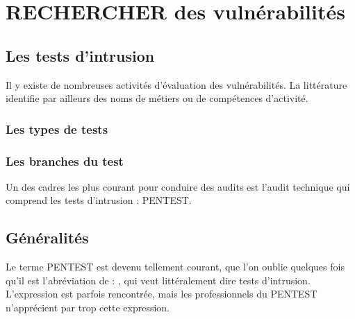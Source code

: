 \uchap{\jobname}


\section{RECHERCHER des vulnérabilités}

\subsection{Les tests d'intrusion}

Il y existe de nombreuses activités d'évaluation des vulnérabilités. La littérature identifie par ailleurs des noms de métiers ou de compétences d'activité.

\begin{frame}
\frametitle<presentation>{Les types de tests}
\end{frame}


\begin{frame}
\frametitle<presentation>{Les branches du test}
\end{frame}



Un des cadres les plus courant pour conduire des audits est l'audit technique qui comprend les tests d'intrusion : PENTEST.

\subsection{Généralités}

Le terme PENTEST est devenu tellement courant, que l'on oublie quelques fois qu'il est l'abréviation de : , qui  veut littéralement dire tests d'intrusion.  L'expression   est parfois rencontrée, mais les professionnels du PENTEST n'apprécient par trop cette expression. 

